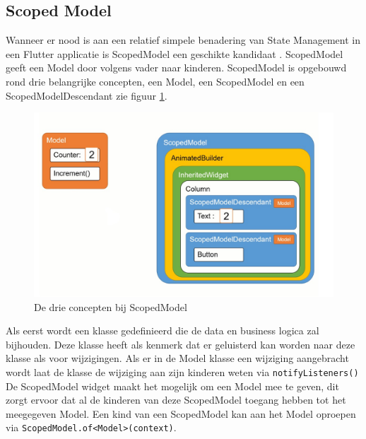 \subsection{Scoped Model}
Wanneer er nood is aan een relatief simpele benadering van State Management in een Flutter applicatie is ScopedModel een geschikte kandidaat \autocite{Boelens2019}. ScopedModel geeft een Model door volgens vader naar kinderen. ScopedModel is opgebouwd rond drie belangrijke concepten, een Model, een ScopedModel en een ScopedModelDescendant zie figuur \ref{fig:scopedmodel}. 

\begin{figure}[H]
    \includegraphics[width=\linewidth]{img/stand-van-zaken/scopedmodel.jpg}
    \caption{De drie concepten bij ScopedModel \autocite{Boelens2019}}
    \label{fig:scopedmodel}
\end{figure}
Als eerst wordt een klasse gedefinieerd die de 
data en business logica zal bijhouden. Deze klasse heeft als kenmerk dat er geluisterd kan worden naar deze klasse als voor wijzigingen. Als er in de Model klasse een wijziging aangebracht wordt laat de klasse de wijziging aan zijn kinderen weten via \verb|notifyListeners()|
\newline
De ScopedModel widget maakt het mogelijk om een Model mee te geven, dit zorgt ervoor dat al de kinderen van deze ScopedModel toegang hebben tot het meegegeven Model. Een kind van een ScopedModel kan aan het Model oproepen via \verb|ScopedModel.of<Model>(context)|.

